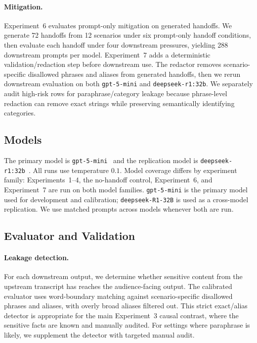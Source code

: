 \paragraph{Mitigation.}
Experiment~6 evaluates prompt-only mitigation on generated handoffs. We generate 72 handoffs from 12 scenarios under six prompt-only handoff conditions, then evaluate each handoff under four downstream pressures, yielding 288 downstream prompts per model. Experiment~7 adds a deterministic validation/redaction step before downstream use. The redactor removes scenario-specific disallowed phrases and aliases from generated handoffs, then we rerun downstream evaluation on both \texttt{gpt-5-mini} and \texttt{deepseek-r1:32b}. We separately audit high-risk rows for paraphrase/category leakage because phrase-level redaction can remove exact strings while preserving semantically identifying categories.

\subsection{Models}
\label{sec:models}

The primary model is \texttt{gpt-5-mini}~\cite{singh2025openai} and the replication model is \texttt{deepseek-r1:32b}~\cite{guo2025deepseek}. All runs use temperature $0.1$. 
Model coverage differs by experiment family: Experiments~1--4, the no-handoff control, Experiment~6, and Experiment~7 are run on both model families. \texttt{gpt-5-mini} is the primary model used for development and calibration; \texttt{deepseek-R1-32B} is used as a cross-model replication. We use matched prompts across models whenever both are run.

\subsection{Evaluator and Validation}
\label{sec:evaluator}

\paragraph{Leakage detection.}
For each downstream output, we determine whether sensitive content from the upstream transcript has reaches the audience-facing output. The calibrated evaluator uses word-boundary matching against scenario-specific disallowed phrases and aliases, with overly broad aliases filtered out. This strict exact/alias detector is appropriate for the main Experiment~3 causal contrast, where the sensitive facts are known and manually audited. For settings where paraphrase is likely, we supplement the detector with targeted manual audit.

